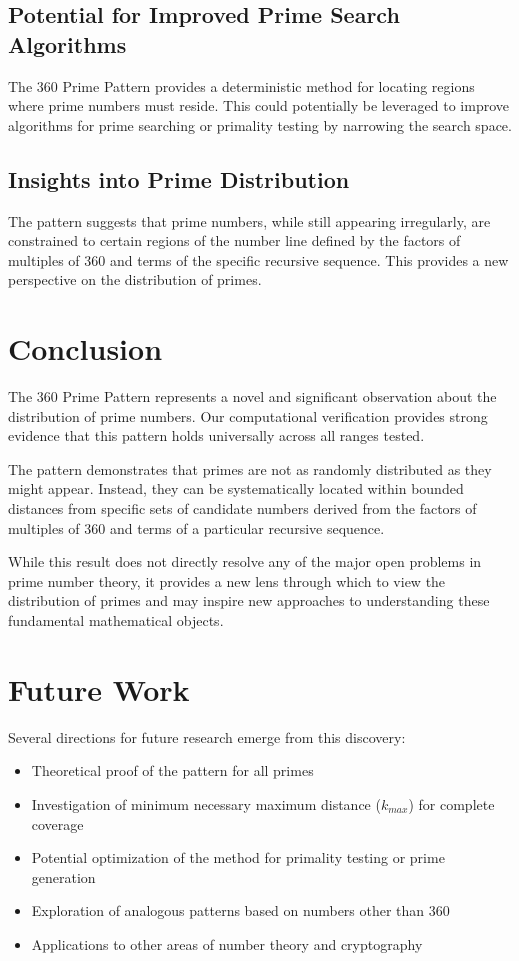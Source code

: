 \documentclass[conference]{IEEEtran}
\begin{document}
\subsection{Potential for Improved Prime Search Algorithms}
The 360 Prime Pattern provides a deterministic method for locating regions where prime numbers must reside. This could potentially be leveraged to improve algorithms for prime searching or primality testing by narrowing the search space.

\subsection{Insights into Prime Distribution}
The pattern suggests that prime numbers, while still appearing irregularly, are constrained to certain regions of the number line defined by the factors of multiples of 360 and terms of the specific recursive sequence. This provides a new perspective on the distribution of primes.

\section{Conclusion}
The 360 Prime Pattern represents a novel and significant observation about the distribution of prime numbers. Our computational verification provides strong evidence that this pattern holds universally across all ranges tested.

The pattern demonstrates that primes are not as randomly distributed as they might appear. Instead, they can be systematically located within bounded distances from specific sets of candidate numbers derived from the factors of multiples of 360 and terms of a particular recursive sequence.

While this result does not directly resolve any of the major open problems in prime number theory, it provides a new lens through which to view the distribution of primes and may inspire new approaches to understanding these fundamental mathematical objects.

\section{Future Work}
Several directions for future research emerge from this discovery:
\begin{itemize}
\item Theoretical proof of the pattern for all primes
\item Investigation of minimum necessary maximum distance ($k_{max}$) for complete coverage
\item Potential optimization of the method for primality testing or prime generation
\item Exploration of analogous patterns based on numbers other than 360
\item Applications to other areas of number theory and cryptography
\end{itemize}
\end{document}
